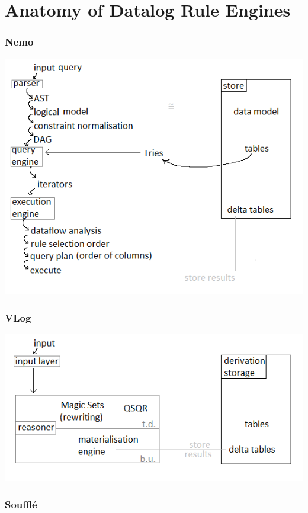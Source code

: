 \documentclass[aspectratio=169]{beamer}
\begin{document}
\section{Anatomy of Datalog Rule Engines}

\begin{frame}
	\frametitle{Nemo}
	\begin{center}
	\includegraphics[scale=.5]{figures/nemo.png}
	\end{center}
	
\end{frame}

\begin{frame}
	\frametitle{VLog}
	\begin{center}
	\includegraphics[scale=.6]{figures/vlog.png}
	\end{center}
\end{frame}

\begin{frame}
	\frametitle{Soufflé}
	\begin{center}
	
	\end{center}
\end{frame}
\end{document}
